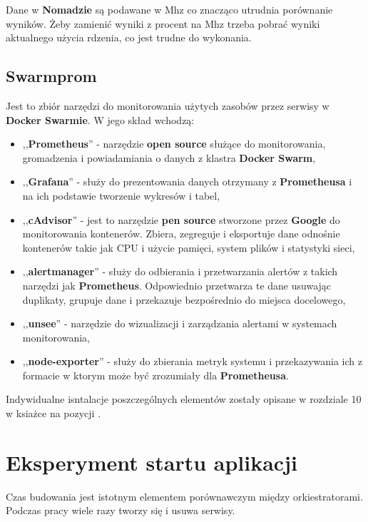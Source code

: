 \documentclass{iiuwb}
\begin{document}
Dane w \textbf{Nomadzie} są podawane w Mhz co znacząco utrudnia 
porównanie wyników. Żeby zamienić wyniki z procent na Mhz trzeba 
pobrać wyniki aktualnego użycia rdzenia, co jest trudne do wykonania.

\subsection{Swarmprom}

Jest to zbiór narzędzi do monitorowania użytych zasobów przez serwisy w \textbf{Docker Swarmie}. W jego skład wchodzą:

\begin{itemize}
    \item ,,\textbf{Prometheus}'' - narzędzie \textbf{open source} służące do monitorowania, gromadzenia i powiadamiania o danych z klastra \textbf{Docker Swarm}, 
    \item ,,\textbf{Grafana}'' - służy do prezentowania danych otrzymany z \textbf{Prometheusa} i na ich podstawie tworzenie wykresów i tabel, 
    \item ,,\textbf{cAdvisor}'' - jest to narzędzie \textbf{pen source} stworzone przez \textbf{Google} do monitorowania kontenerów. Zbiera, zegreguje i eksportuje dane odnośnie kontenerów takie jak CPU i użycie pamięci, system plików i statystyki sieci, 
    \item ,,\textbf{alertmanager}'' - służy do odbierania i przetwarzania alertów z takich narzędzi jak \textbf{Prometheus}. Odpowiednio przetwarza te dane usuwając duplikaty, grupuje dane i przekazuje bezpośrednio do miejsca docelowego, 
    \item ,,\textbf{unsee}'' - narzędzie do wizualizacji i zarządzania alertami w systemach monitorowania, 
    \item ,,\textbf{node-exporter}'' - służy do zbierania metryk systemu i przekazywania ich z formacie w ktorym może być zrozumiały dla \textbf{Prometheusa}.
\end{itemize}

Indywidualne isntalacje poszczególnych elementów
zostały opisane w rozdziale 10 w ksiażce 
na pozycji \cite{DockerSwarm}.

\section{Eksperyment startu aplikacji}

Czas budowania jest istotnym elementem porównawczym między orkiestratorami. Podczas pracy wiele razy tworzy się i usuwa serwisy. 
\end{document}

